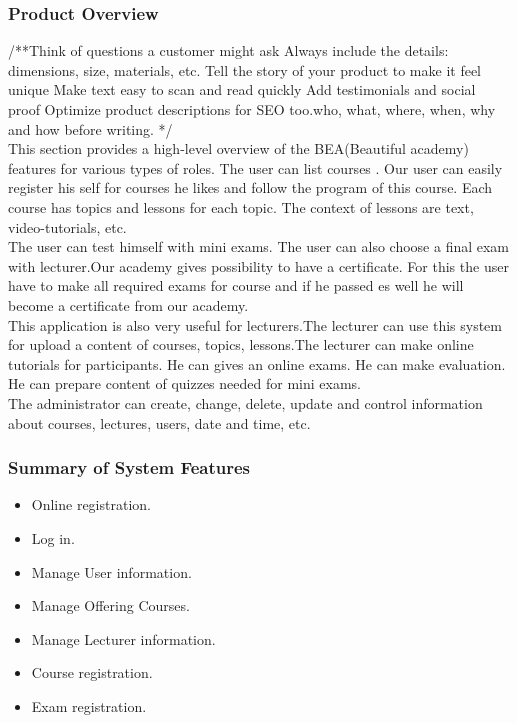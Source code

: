 \documentclass{scrartcl}
\begin{document}
  	\subsubsection{Product Overview}
  	/**Think of questions a customer might ask
Always include the details: dimensions, size, materials, etc.
Tell the story of your product to make it feel unique
Make text easy to scan and read quickly
Add testimonials and social proof
Optimize product descriptions for SEO too.who, what, where, when, why and how before writing. */\\
  	This  section provides a high-level overview of the BEA(Beautiful academy) features for various types of roles.
 The user can list courses . 
 Our user can easily register his self for courses he likes and follow the program of this course. Each course has topics and lessons for each topic. The context of lessons are text, video-tutorials, etc. \\
  	The user can test himself with mini exams. The user can also choose a final exam with lecturer.Our academy gives possibility to have a certificate. For this the user have to make all required exams for course and if he passed es well he will become a certificate from our academy. \\
  	This application is also very useful for lecturers.The lecturer can use this system for upload a content of courses, topics, lessons.The lecturer can make online tutorials for participants. He can gives an online exams. He can make evaluation. He can prepare content of quizzes needed for mini exams.\\
  	The administrator can create, change, delete, update and control information about courses, lectures, users, date and time, etc.
  	
  	
  	\subsubsection{Summary of System Features}
  	
  	\begin{itemize}
  	\item Online registration.
  	\item Log in.
  	\item Manage User information.
  	\item Manage Offering Courses.
  	\item Manage Lecturer information.
  	\item Course registration.
  	\item Exam registration.
  	\end{itemize}
  	
\end{document}
